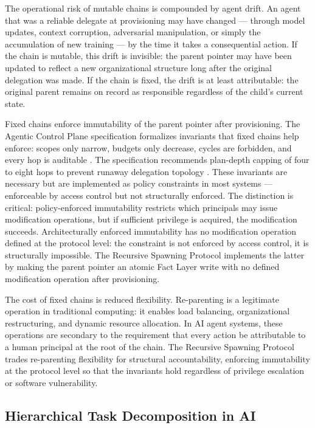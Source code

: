 The operational risk of mutable chains is compounded by agent drift. An agent that was a reliable delegate at provisioning may have changed — through model updates, context corruption, adversarial manipulation, or simply the accumulation of new training — by the time it takes a consequential action. If the chain is mutable, this drift is invisible: the parent pointer may have been updated to reflect a new organizational structure long after the original delegation was made. If the chain is fixed, the drift is at least attributable: the original parent remains on record as responsible regardless of the child's current state.

Fixed chains enforce immutability of the parent pointer after provisioning. The Agentic Control Plane specification formalizes invariants that fixed chains help enforce: scopes only narrow, budgets only decrease, cycles are forbidden, and every hop is auditable \cite{agentic-control-plane}. The specification recommends plan-depth capping of four to eight hops to prevent runaway delegation topology \cite{agentic-control-plane}. These invariants are necessary but are implemented as policy constraints in most systems — enforceable by access control but not structurally enforced. The distinction is critical: policy-enforced immutability restricts which principals may issue modification operations, but if sufficient privilege is acquired, the modification succeeds. Architecturally enforced immutability has no modification operation defined at the protocol level: the constraint is not enforced by access control, it is structurally impossible. The Recursive Spawning Protocol implements the latter by making the parent pointer an atomic Fact Layer write with no defined modification operation after provisioning.

The cost of fixed chains is reduced flexibility. Re-parenting is a legitimate operation in traditional computing: it enables load balancing, organizational restructuring, and dynamic resource allocation. In AI agent systems, these operations are secondary to the requirement that every action be attributable to a human principal at the root of the chain. The Recursive Spawning Protocol trades re-parenting flexibility for structural accountability, enforcing immutability at the protocol level so that the invariants hold regardless of privilege escalation or software vulnerability.

\subsection{Hierarchical Task Decomposition in AI}
\label{sec:htn}

